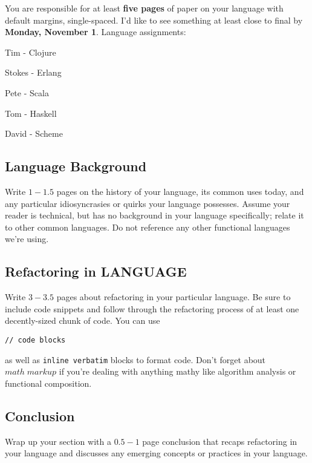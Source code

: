 \documentclass{article}
\begin{document}

You are responsible for at least \textbf{five pages} of paper on your language with default margins, single-spaced. I'd like to see something at least close to final by \textbf{Monday, November 1}. Language assignments:

\begin{itemize*}
\item Tim - Clojure
\item Stokes - Erlang
\item Pete - Scala
\item Tom - Haskell
\item David - Scheme
\end{itemize*}

\subsection*{Language Background}

Write $1-1.5$ pages on the history of your language, its common uses today, and any particular idiosyncrasies or quirks your language possesses. Assume your reader is technical, but has no background in your language specifically; relate it to other common languages. Do not reference any other functional languages we're using.

\subsection*{Refactoring in LANGUAGE}

Write $3-3.5$ pages about refactoring in your particular language. Be sure to include code snippets and follow through the refactoring process of at least one decently-sized chunk of code. You can use

\begin{verbatim}
// code blocks
\end{verbatim}

as well as \verb!inline verbatim! blocks to format code. Don't forget about $math \; markup$ if you're dealing with anything mathy like algorithm analysis or functional composition.

\subsection*{Conclusion}

Wrap up your section with a $0.5-1$ page conclusion that recaps refactoring in your language and discusses any emerging concepts or practices in your language.
\end{document}
